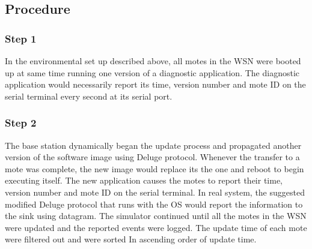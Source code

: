 \documentclass[conference]{IEEEtran}
\newcommand{\notedme}[1]{\raisebox{0pt}[0pt][0pt]{\pdfcomment[open=true,color=blue]{#1}}}
\begin{document}
\subsection*{Procedure}
\label{subsec:proc}
%
%
%
\subsubsection*{Step 1} 
In the environmental set up described above, all motes in the WSN were booted up at same time running one version of a diagnostic application. 
The diagnostic application would necessarily report its time, version number and mote ID on the serial terminal every second at its serial port. 


\subsubsection*{Step 2} 
The base station dynamically began the update process and propagated another version of the software image using Deluge protocol. %
Whenever the transfer to a mote was complete, the new image would replace its the one and reboot to begin executing itself.
The  new application causes the motes to report their time, version number and mote ID on the serial terminal. 
In real system, the suggested modified Deluge protocol that runs with the OS would report the information to the sink using datagram.
The simulator continued until all the motes in the WSN were updated and the reported events were logged. 
The update time of each mote were filtered out  and were sorted In ascending order of update time.

\end{document}
